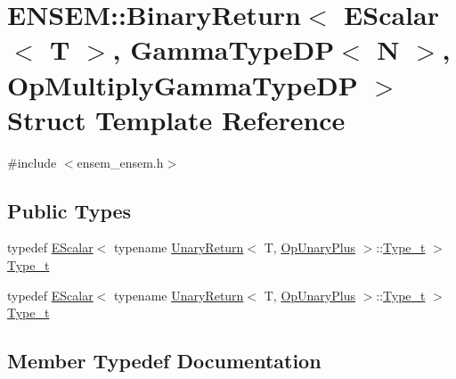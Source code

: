 \hypertarget{structENSEM_1_1BinaryReturn_3_01EScalar_3_01T_01_4_00_01GammaTypeDP_3_01N_01_4_00_01OpMultiplyGammaTypeDP_01_4}{}\section{E\+N\+S\+EM\+:\+:Binary\+Return$<$ E\+Scalar$<$ T $>$, Gamma\+Type\+DP$<$ N $>$, Op\+Multiply\+Gamma\+Type\+DP $>$ Struct Template Reference}
\label{structENSEM_1_1BinaryReturn_3_01EScalar_3_01T_01_4_00_01GammaTypeDP_3_01N_01_4_00_01OpMultiplyGammaTypeDP_01_4}


{\ttfamily \#include $<$ensem\+\_\+ensem.\+h$>$}

\subsection*{Public Types}
\begin{DoxyCompactItemize}
\item 
typedef \mbox{\hyperlink{classENSEM_1_1EScalar}{E\+Scalar}}$<$ typename \mbox{\hyperlink{structENSEM_1_1UnaryReturn}{Unary\+Return}}$<$ T, \mbox{\hyperlink{structENSEM_1_1OpUnaryPlus}{Op\+Unary\+Plus}} $>$\+::\mbox{\hyperlink{structENSEM_1_1BinaryReturn_3_01EScalar_3_01T_01_4_00_01GammaTypeDP_3_01N_01_4_00_01OpMultiplyGammaTypeDP_01_4_a6d1755953f12843663e53d693c99e7f8}{Type\+\_\+t}} $>$ \mbox{\hyperlink{structENSEM_1_1BinaryReturn_3_01EScalar_3_01T_01_4_00_01GammaTypeDP_3_01N_01_4_00_01OpMultiplyGammaTypeDP_01_4_a6d1755953f12843663e53d693c99e7f8}{Type\+\_\+t}}
\item 
typedef \mbox{\hyperlink{classENSEM_1_1EScalar}{E\+Scalar}}$<$ typename \mbox{\hyperlink{structENSEM_1_1UnaryReturn}{Unary\+Return}}$<$ T, \mbox{\hyperlink{structENSEM_1_1OpUnaryPlus}{Op\+Unary\+Plus}} $>$\+::\mbox{\hyperlink{structENSEM_1_1BinaryReturn_3_01EScalar_3_01T_01_4_00_01GammaTypeDP_3_01N_01_4_00_01OpMultiplyGammaTypeDP_01_4_a6d1755953f12843663e53d693c99e7f8}{Type\+\_\+t}} $>$ \mbox{\hyperlink{structENSEM_1_1BinaryReturn_3_01EScalar_3_01T_01_4_00_01GammaTypeDP_3_01N_01_4_00_01OpMultiplyGammaTypeDP_01_4_a6d1755953f12843663e53d693c99e7f8}{Type\+\_\+t}}
\end{DoxyCompactItemize}


\subsection{Member Typedef Documentation}
\mbox{\label{structENSEM_1_1BinaryReturn_3_01EScalar_3_01T_01_4_00_01GammaTypeDP_3_01N_01_4_00_01OpMultiplyGammaTypeDP_01_4_a6d1755953f12843663e53d693c99e7f8}} 
